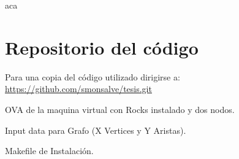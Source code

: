 \documentclass[twoside,letterpaper,12pt]{report}
\begin{document}
\newpage



	
aca
\cite{czarnecki2000generative}
\cite{wwwBoost}
\cite{stroustrup2013c++}
\cite{andrei2001modern}
\cite{Wall2000}
\cite{Boost}
\cite{Karniadakis}
\cite{Kernighan1988}


\todo[inline,caption={TODO}]{
}

\newpage

\appendix
\chapter{Repositorio del código}

Para una copia del código utilizado dirigirse a: \url{https://github.com/smonsalve/tesis.git}

OVA de la maquina virtual con Rocks instalado y dos nodos.

Input data para Grafo (X Vertices y Y Aristas).

Makefile de Instalación.
\end{document}
